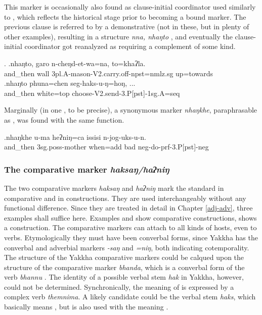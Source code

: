 This marker is occasionally also found as clause-initial coordinator used similarly to \Next, which reflects the historical stage prior to becoming a bound marker.  The previous clause is referred to by a demonstrative (not in these, but in plenty of other examples), resulting in a structure \emph{nna, nhaŋto} , and eventually  the clause-initial coordinator got reanalyzed as requiring a complement of some kind.

\ex. \ag.nhaŋto, garo n-cheŋd-et-wa=na,    to=khaʔla.\\
and\_then wall {\sc 3pl.A-}mason{\sc -V2.carry.off-npst=nmlz.sg} up=towards\\
 
\bg.nhaŋto phuna=chen            seg-haks-u-ŋ=hoŋ, ...\\
and\_then white{\sc =top} choose{\sc -V2.send-3.P[pst]-1sg.A=seq}\\

Marginally (in one , to be precise),  a synonymous marker \emph{nhaŋkhe}, paraphrasable as , was found with the same function.

\exg.nhaŋkhe        u-ma              heʔniŋ=ca        issisi n-jog-uks-u-n.\\
and\_then {\sc 3sg.poss-}mother when{\sc =add} bad {\sc neg-}do{\sc -prf-3.P[pst]-neg}\\
 

\subsubsection{The comparative marker \emph{haksaŋ/haʔniŋ}}
  
  The two comparative markers \emph{haksaŋ} and \emph{haʔniŋ} mark the standard in comparative and in  constructions. They are used interchangeably without any functional difference. Since they are treated in detail in Chapter \ref{adj-adv}, three examples shall suffice here. Examples \Next[a] and \Next[b] show comparative constructions, \Next[c] shows a  construction. The comparative markers can attach to all kinds of hosts, even to verbs. Etymologically they must have been converbal forms, since Yakkha has the converbal and adverbial  markers \mbox{\emph{-saŋ}} and \mbox{\emph{=niŋ}}, both indicating cotemporality. The structure of the Yakkha comparative markers could be calqued upon the structure of the  comparative marker \emph{bhanda}, which is a converbal form of the verb \emph{bhannu} . The identity of a possible verbal stem \emph{hak} in Yakkha, however, could not be determined. Synchronically, the meaning of  is expressed by a complex verb \emph{themnima}. A likely candidate could be the verbal stem \emph{haks}, which basically means , but is also used with the meaning .\largerpage
  
